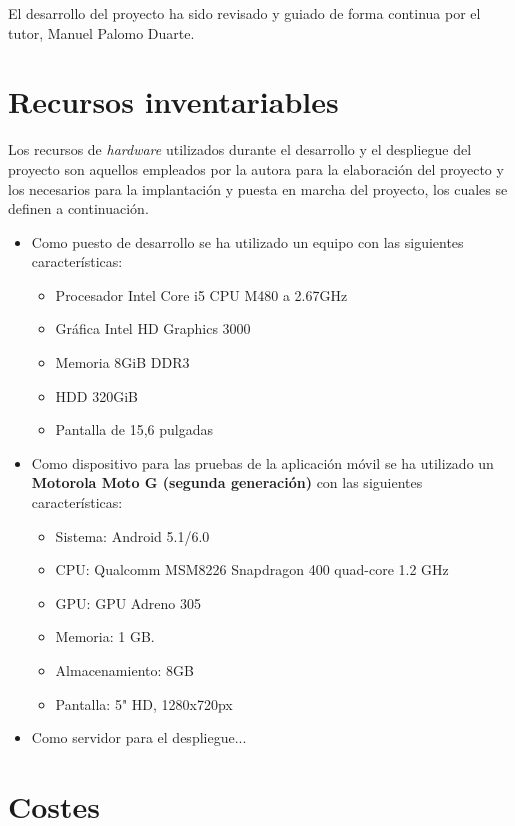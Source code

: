 El desarrollo del proyecto ha sido revisado y guiado de forma continua por el
tutor, Manuel Palomo Duarte.

\section{Recursos inventariables}

Los recursos de \textit{hardware} utilizados durante el desarrollo y el
despliegue del proyecto son aquellos empleados por la autora para la elaboración
del proyecto y los necesarios para la implantación y puesta en marcha del
proyecto, los cuales se definen a continuación.

\begin{itemize}
\item Como puesto de desarrollo se ha utilizado un equipo con las siguientes
  características:
  \begin{itemize}
  \item Procesador Intel Core i5 CPU M480 a 2.67GHz
  \item Gráfica Intel HD Graphics 3000
  \item Memoria 8GiB DDR3
  \item HDD 320GiB
  \item Pantalla de 15,6 pulgadas
  \end{itemize}

\item Como dispositivo para las pruebas de la aplicación móvil se ha utilizado
  un \textbf{Motorola Moto G (segunda generación)} con las siguientes
  características:

  \begin{itemize}
  \item Sistema: Android 5.1/6.0
  \item CPU: Qualcomm MSM8226 Snapdragon 400 quad-core 1.2 GHz
  \item GPU: GPU Adreno 305
  \item Memoria: 1 GB.
  \item Almacenamiento: 8GB
  \item Pantalla: 5" HD, 1280x720px
  \end{itemize}

\item Como servidor para el despliegue...
  
\end{itemize}


\section{Costes}


